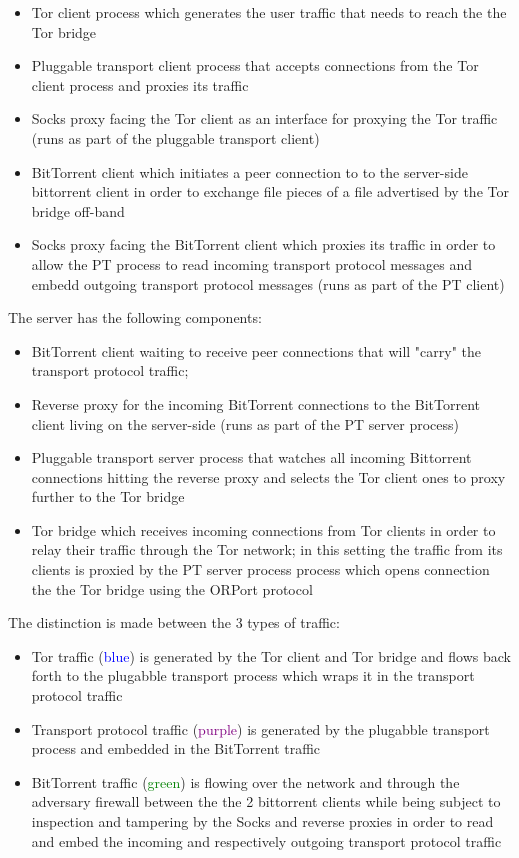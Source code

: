\documentclass[11pt]{article} %
\begin{document}
\begin{itemize}
\item Tor client process which generates the user traffic that needs to reach the the Tor bridge
\item Pluggable transport client process that accepts connections from the Tor client process and proxies its traffic
\item Socks proxy facing the Tor client as an interface for proxying the Tor traffic (runs as part of the pluggable transport client) 
\item BitTorrent client which initiates a peer connection to to the server-side bittorrent client in order to exchange file pieces of a file advertised by the Tor bridge off-band
\item Socks proxy facing the BitTorrent client which proxies its traffic in order to allow the PT process to read   incoming transport protocol messages and embedd outgoing transport protocol messages (runs as part of the PT client) 
\end{itemize}

The server has the following components:

\begin{itemize}

\item BitTorrent client waiting to receive peer connections that will "carry" the transport protocol traffic; 
\item Reverse proxy for the incoming BitTorrent connections to the BitTorrent client living on the server-side (runs as part of the PT server process)
\item Pluggable transport server process that watches all incoming Bittorrent connections hitting the reverse proxy and selects the Tor client ones to proxy further to the Tor bridge
\item Tor bridge which receives incoming connections from Tor clients in order to relay their traffic through the Tor network; in this setting the traffic from its clients is proxied by the PT server process process which opens connection the the Tor bridge using the ORPort protocol

\end{itemize}


The distinction is made between the 3 types of traffic:

\begin{itemize}
\item Tor traffic (\textcolor{blue}{blue}) is generated by the Tor client and Tor bridge and flows back forth to the plugabble transport process which wraps it in the transport protocol traffic 
\item Transport protocol traffic (\textcolor{purple}{purple}) is generated by the plugabble transport process and embedded in the BitTorrent traffic
\item  BitTorrent traffic (\textcolor{green}{green}) is flowing over the network and through the adversary firewall between the the 2 bittorrent clients while being subject to inspection and tampering by the Socks and reverse proxies in order to read and embed the incoming and respectively outgoing transport protocol traffic 
\end{itemize}
\end{document}

